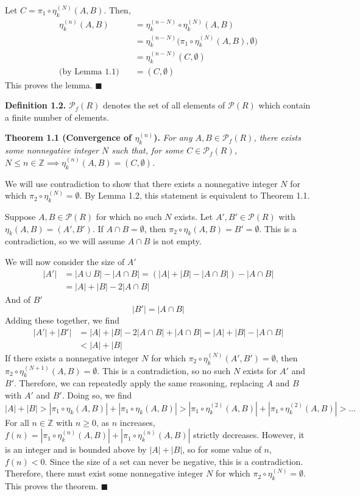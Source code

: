 \documentclass{article}
\newcommand{\abs}[1]{\left|#1\right|}
\newcommand{\zee}{\mathbb{Z}}
\begin{document}
Let $C = \pi_1 \circ \eta_k^{(N)}(A, B)$. Then,
\[\begin{split}
    \eta_k^{(n)}(A, B)
    &= \eta_k^{(n-N)} \circ \eta_k^{(N)}(A, B) \\
    &= \eta_k^{(n-N)}\big(
        \pi_1 \circ \eta_k^{(N)}(A, B), \emptyset
    \big) \\
    &= \eta_k^{(n-N)}(C, \emptyset) \\
    \text{(by Lemma 1.1)}\quad
    &= (C, \emptyset)
\end{split}\]
This proves the lemma. $\blacksquare$

\textbf{Definition 1.2.} $\mathcal{P}_f(R)$ denotes the
set of all elements of $\mathcal{P}(R)$ which contain
a finite number of elements.

\textbf{Theorem 1.1 (Convergence of $\eta_k^{(n)}$).} \textit{
    For any $A, B \in \mathcal{P}_f(R)$, there exists
    some nonnegative integer $N$
    such that, for some $C \in \mathcal{P}_f(R)$,
    $N \leq n \in \zee \implies \eta_k^{(n)}(A, B) = (C, \emptyset)$.
}

We will use contradiction to show that there exists a nonnegative
integer $N$ for which $\pi_2 \circ \eta_k^{(N)} = \emptyset$.
By Lemma 1.2, this statement is equivalent to Theorem 1.1.

Suppose $A, B \in \mathcal{P}(R)$ for which no such $N$ exists.
Let $A', B' \in \mathcal{P}(R)$ with $\eta_k(A, B) = (A', B')$.
If $A \cap B = \emptyset$, then $\pi_2 \circ \eta_k(A, B)
= B' = \emptyset$.
This is a contradiction, so we will assume $A \cap B$ is not empty.

We will now consider the size of $A'$
\[\begin{split}
    \abs{A'} &= \abs{A \cup B} - \abs{A \cap B}
    = (\abs{A} + \abs{B} - \abs{A \cap B}) - \abs{A \cap B} \\
    &= \abs{A} + \abs{B} - 2\abs{A \cap B}
\end{split}\]
And of $B'$
\[\abs{B'} = \abs{A \cap B}\]
Adding these together, we find
\[\begin{split}
\abs{A'} + \abs{B'}
&= \abs{A} + \abs{B} - 2\abs{A \cap B} + \abs{A \cap B}
= \abs{A} + \abs{B} - \abs{A \cap B} \\
&< \abs{A} + \abs{B}
\end{split}\]
If there exists a nonnegative integer $N$ for which
$\pi_2 \circ \eta_k^{(N)}(A', B') = \emptyset$, then
$\pi_2 \circ \eta_k^{(N+1)}(A, B) = \emptyset$. This is
a contradiction, so no such $N$ exists for $A'$ and $B'$.
Therefore, we can repeatedly apply the same reasoning, replacing
$A$ and $B$ with $A'$ and $B'$. Doing so, we find
\[\abs{A} + \abs{B}
> \abs{\pi_1 \circ \eta_k(A, B)} + \abs{\pi_1 \circ \eta_k(A, B)}
> \abs{\pi_1 \circ \eta_k^{(2)}(A, B)}
    + \abs{\pi_1 \circ \eta_k^{(2)}(A, B)}
> \ldots\]
For all $n \in \zee$ with $n \geq 0$, as $n$ increases,
$f(n) = \abs{\pi_1 \circ \eta_k^{(n)}(A, B)}
+ \abs{\pi_1 \circ \eta_k^{(n)}(A, B)}$ strictly decreases.
However, it is an integer and is bounded above by
$\abs{A} + \abs{B}$, so for some value of $n$, $f(n) < 0$.
Since the size of a set can never be negative, this is a contradiction.
Therefore, there must exist some nonnegative integer $N$ for which
$\pi_2 \circ \eta_k^{(N)} = \emptyset$. This proves the theorem.
$\blacksquare$
\end{document}

